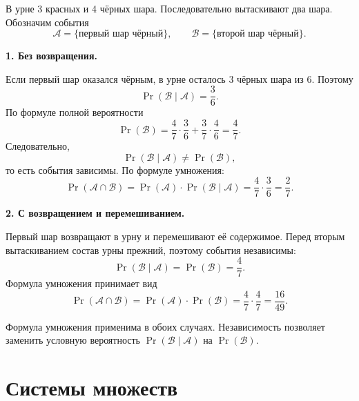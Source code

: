 \begin{example}
    В урне 3 красных и 4 чёрных шара. Последовательно
    вытаскивают два шара. Обозначим события
    \[
        \mathcal{A} = \{\text{первый шар чёрный}\},
        \qquad
        \mathcal{B} = \{\text{второй шар чёрный}\}.
    \]

    \textbf{1. Без возвращения.}

    Если первый шар оказался чёрным, в урне осталось
    3 чёрных шара из 6. Поэтому
    \[
        \Pr(\mathcal{B} \mid \mathcal{A}) = \frac{3}{6}.
    \]
    По формуле полной вероятности
    \[
        \Pr(\mathcal{B})
        =
        \frac{4}{7} \cdot \frac{3}{6}
        +
        \frac{3}{7} \cdot \frac{4}{6}
        =
        \frac{4}{7}.
    \]
    Следовательно,
    \[
        \Pr(\mathcal{B} \mid \mathcal{A})
        \neq
        \Pr(\mathcal{B}),
    \]
    то есть события зависимы. По формуле умножения:
    \[
        \Pr(\mathcal{A} \cap \mathcal{B})
        =
        \Pr(\mathcal{A})
        \cdot \Pr(\mathcal{B} \mid \mathcal{A})
        =
        \frac{4}{7} \cdot \frac{3}{6}
        =
        \frac{2}{7}.
    \]

    \textbf{2. С возвращением и перемешиванием.}

    Первый шар возвращают в урну и перемешивают её содержимое.
    Перед вторым вытаскиванием состав урны прежний,
    поэтому события независимы:
    \[
        \Pr(\mathcal{B} \mid \mathcal{A})
        =
        \Pr(\mathcal{B})
        =
        \frac{4}{7}.
    \]
    Формула умножения принимает вид
    \[
        \Pr(\mathcal{A} \cap \mathcal{B})
        =
        \Pr(\mathcal{A}) \cdot \Pr(\mathcal{B})
        =
        \frac{4}{7} \cdot \frac{4}{7}
        =
        \frac{16}{49}.
    \]

    Формула умножения применима в обоих случаях.
    Независимость позволяет заменить условную вероятность
    $\Pr(\mathcal{B} \mid \mathcal{A})$ на $\Pr(\mathcal{B})$.
\end{example}

\section{Системы множеств}

